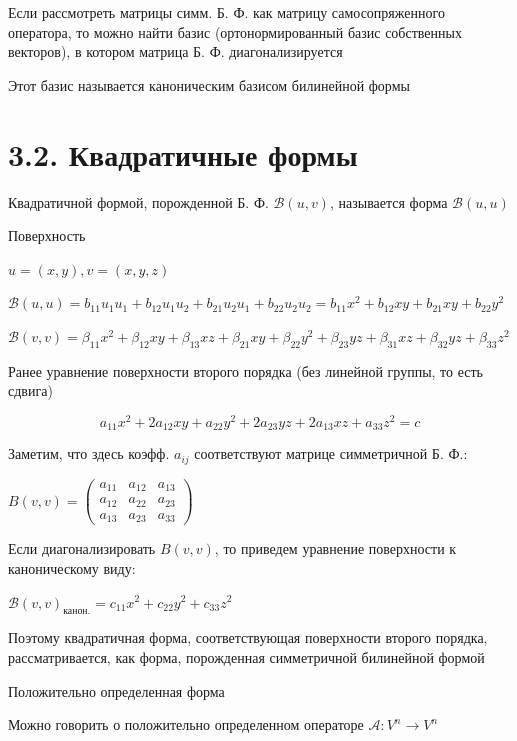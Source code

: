\documentclass[12pt]{article}
\begin{document}
    Если рассмотреть матрицы симм. Б. Ф. как матрицу самосопряженного оператора, то можно найти базис
    (ортонормированный базис собственных векторов), в котором матрица Б. Ф. диагонализируется

    Этот базис называется каноническим базисом билинейной формы

    \section{3.2. Квадратичные формы}

    \Def Квадратичной формой, порожденной Б. Ф. $\mathcal{B}(u, v)$, называется форма $\mathcal{B}(u, u)$

    \Ex Поверхность

    $u = (x, y), v = (x, y, z)$

    $\displaystyle \mathcal{B}(u, u) = b_{11}u_1 u_1 + b_{12} u_1 u_2 + b_{21} u_2 u_1 + b_{22} u_2 u_2 = b_{11} x^2 + b_{12}xy + b_{21}xy + b_{22}y^2$

    $\displaystyle \mathcal{B}(v, v) = \beta_{11} x^2 + \beta_{12}xy + \beta_{13}xz + \beta_{21} xy + \beta_{22}y^2 + \beta_{23}yz + \beta_{31} xz + \beta_{32}yz + \beta_{33}z^2$

    \Mem Ранее уравнение поверхности второго порядка (без линейной группы, то есть сдвига)

    \[a_{11}x^2 + 2a_{12}xy + a_{22}y^2 + 2a_{23}yz + 2a_{13}xz + a_{33}z^2 = c\]

    \Nota Заметим, что здесь коэфф. $\displaystyle a_{ij}$ соответствуют матрице симметричной Б. Ф.:

    $\displaystyle B(v, v) = \begin{pmatrix}a_{11} & a_{12} & a_{13} \\ a_{12} & a_{22} & a_{23} \\ a_{13} & a_{23} & a_{33}\end{pmatrix}$

    Если диагонализировать $B(v, v)$, то приведем уравнение поверхности к каноническому виду:

    $\displaystyle \mathcal{B}(v, v)_{\text{канон.}} = c_{11}x^2 + c_{22}y^2 + c_{33}z^2$

    Поэтому квадратичная форма, соответствующая поверхности второго порядка, рассматривается, как форма, порожденная симметричной билинейной формой

    \Def Положительно определенная форма

    \Nota Можно говорить о положительно определенном операторе $\displaystyle \mathcal{A}: V^n \rightarrow V^n$
\end{document}
